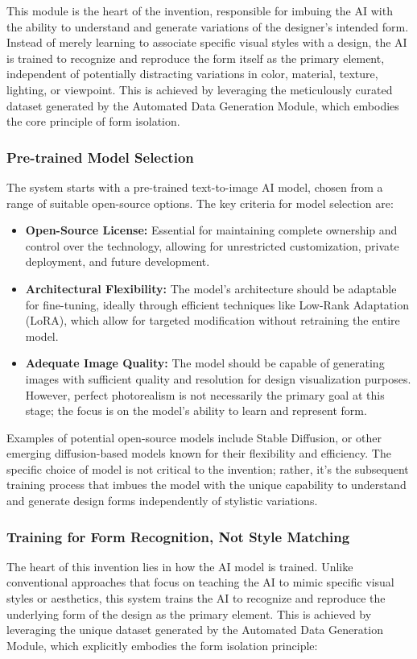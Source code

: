 \documentclass{article}
\begin{document}
\begin{itemize}
This module is the heart of the invention, responsible for imbuing the AI with the ability to understand and generate variations of the designer's intended form. Instead of merely learning to associate specific visual styles with a design, the AI is trained to recognize and reproduce the form itself as the primary element, independent of potentially distracting variations in color, material, texture, lighting, or viewpoint. This is achieved by leveraging the meticulously curated dataset generated by the Automated Data Generation Module, which embodies the core principle of form isolation.

\subsubsection{Pre-trained Model Selection}
The system starts with a pre-trained text-to-image AI model, chosen from a range of suitable open-source options. The key criteria for model selection are:

\begin{itemize}
    \item \textbf{Open-Source License:} Essential for maintaining complete ownership and control over the technology, allowing for unrestricted customization, private deployment, and future development.
    \item \textbf{Architectural Flexibility:} The model's architecture should be adaptable for fine-tuning, ideally through efficient techniques like Low-Rank Adaptation (LoRA), which allow for targeted modification without retraining the entire model.
    \item \textbf{Adequate Image Quality:} The model should be capable of generating images with sufficient quality and resolution for design visualization purposes. However, perfect photorealism is not necessarily the primary goal at this stage; the focus is on the model's ability to learn and represent form.
\end{itemize}

Examples of potential open-source models include Stable Diffusion, or other emerging diffusion-based models known for their flexibility and efficiency. The specific choice of model is not critical to the invention; rather, it's the subsequent training process that imbues the model with the unique capability to understand and generate design forms independently of stylistic variations.

\subsubsection{Training for Form Recognition, Not Style Matching}
The heart of this invention lies in how the AI model is trained. Unlike conventional approaches that focus on teaching the AI to mimic specific visual styles or aesthetics, this system trains the AI to recognize and reproduce the underlying form of the design as the primary element. This is achieved by leveraging the unique dataset generated by the Automated Data Generation Module, which explicitly embodies the form isolation principle:


\end{itemize}
\end{document}
